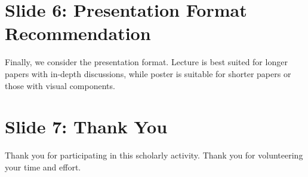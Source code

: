 \documentclass{article}
\begin{document}
\section*{Slide 6: Presentation Format Recommendation}
Finally, we consider the presentation format. Lecture is best suited for longer papers with in-depth discussions, while poster is suitable for shorter papers or those with visual components.

\section*{Slide 7: Thank You}
Thank you for participating in this scholarly activity. Thank you for volunteering your time and effort.
\end{document}
